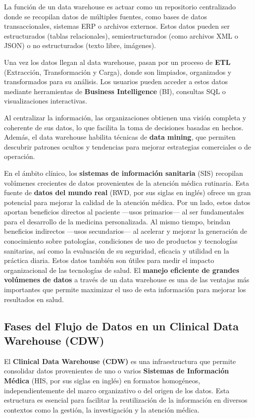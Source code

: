 \documentclass[12pt, a4paper, twoside]{article}
\begin{document}
	La función de un data warehouse es actuar como un repositorio centralizado donde se recopilan datos de múltiples fuentes, como bases de datos transaccionales, sistemas ERP o archivos externos. Estos datos pueden ser estructurados (tablas relacionales), semiestructurados (como archivos XML o JSON) o no estructurados (texto libre, imágenes)\cite{Portal2017}.
	
	Una vez los datos llegan al data warehouse, pasan por un proceso de \textbf{ETL} (Extracción, Transformación y Carga), donde son limpiados, organizados y transformados para su análisis. Los usuarios pueden acceder a estos datos mediante herramientas de \textbf{Business Intelligence} (BI), consultas SQL o visualizaciones interactivas.
	
	Al centralizar la información, las organizaciones obtienen una visión completa y coherente de sus datos, lo que facilita la toma de decisiones basadas en hechos. Además, el data warehouse habilita técnicas de \textbf{data mining}, que permiten descubrir patrones ocultos y tendencias para mejorar estrategias comerciales o de operación\cite{kimball2013}.
	
	En el ámbito clínico, los \textbf{sistemas de información sanitaria} (SIS) recopilan volúmenes crecientes de datos provenientes de la atención médica rutinaria. Esta fuente de \textbf{datos del mundo real} (RWD, por sus siglas en inglés) ofrece un gran potencial para mejorar la calidad de la atención médica. Por un lado, estos datos aportan beneficios directos al paciente —usos primarios— al ser fundamentales para el desarrollo de la medicina personalizada. Al mismo tiempo, brindan beneficios indirectos —usos secundarios— al acelerar y mejorar la generación de conocimiento sobre patologías, condiciones de uso de productos y tecnologías sanitarias, así como la evaluación de su seguridad, eficacia y utilidad en la práctica diaria. Estos datos también son útiles para medir el impacto organizacional de las tecnologías de salud. El \textbf{manejo eficiente de grandes volúmenes de datos} a través de un data warehouse es una de las ventajas más importantes que permite maximizar el uso de esta información para mejorar los resultados en salud.
	
	
	\subsection{Fases del Flujo de Datos en un Clinical Data Warehouse (CDW)}
	
	El \textbf{Clinical Data Warehouse (CDW)} es una infraestructura que permite consolidar datos provenientes de uno o varios \textbf{Sistemas de Información Médica} (HIS, por sus siglas en inglés) en formatos homogéneos, independientemente del marco organizativo o del origen de los datos. Esta estructura es esencial para facilitar la reutilización de la información en diversos contextos como la gestión, la investigación y la atención médica. \cite{doutreligne2023}
	
\end{document}

